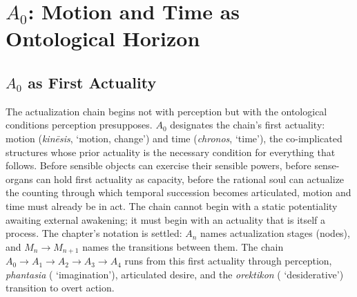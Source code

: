 \section{$A_0$: Motion and Time as Ontological Horizon}

\subsection{$A_0$ as First Actuality}

The actualization chain begins not with perception but with the ontological conditions perception presupposes. $A_0$ designates the chain's first actuality: motion (\textit{kinēsis},  `motion, change') and time (\textit{chronos},  `time'), the co-implicated structures whose prior actuality is the necessary condition for everything that follows. Before sensible objects can exercise their sensible powers, before sense-organs can hold first actuality as capacity, before the rational soul can actualize the counting through which temporal succession becomes articulated, motion and time must already be in act. The chain cannot begin with a static potentiality awaiting external awakening; it must begin with an actuality that is itself a process. The chapter's notation is settled: $A_n$ names actualization stages (nodes), and $M_n \rightarrow M_{n+1}$ names the transitions between them. The chain $A_0 \rightarrow A_1 \rightarrow A_2 \rightarrow A_3 \rightarrow A_4$ runs from this first actuality through perception, \textit{phantasia} ( `imagination'), articulated desire, and the \textit{orektikon} ( `desiderative') transition to overt action.

